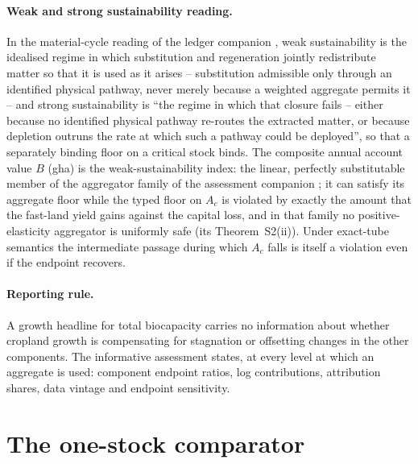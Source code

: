 \paragraph{Weak and strong sustainability reading.} In the material-cycle reading of the ledger companion \citep{Abaee2026c}, weak sustainability is the idealised regime in which substitution and regeneration jointly redistribute matter so that it is used as it arises -- substitution admissible only through an identified physical pathway, never merely because a weighted aggregate permits it -- and strong sustainability is ``the regime in which that closure fails -- either because no identified physical pathway re-routes the extracted matter, or because depletion outruns the rate at which such a pathway could be deployed'', so that a separately binding floor on a critical stock binds. The composite annual account value $B$ (gha) is the weak-sustainability index: the linear, perfectly substitutable member of the aggregator family of the assessment companion \citep[Lemma~A of][]{Abaee2026b}; it can satisfy its aggregate floor while the typed floor on $A_c$ is violated by exactly the amount that the fast-land yield gains against the capital loss, and in that family no positive-elasticity aggregator is uniformly safe (its Theorem~S2(ii)). Under exact-tube semantics the intermediate passage during which $A_c$ falls is itself a violation even if the endpoint recovers.

\paragraph{Reporting rule.} A growth headline for total biocapacity carries no information about whether cropland growth is compensating for stagnation or offsetting changes in the other components. The informative assessment states, at every level at which an aggregate is used: component endpoint ratios, log contributions, attribution shares, data vintage and endpoint sensitivity.

\section{The one-stock comparator}\label{si:onestock}

